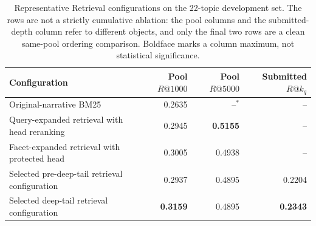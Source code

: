 \begin{table}[tb]
\centering
\caption{Representative Retrieval configurations on the 22-topic
development set. The rows are not a strictly cumulative ablation: the
pool columns and the submitted-depth column refer to different objects,
and only the final two rows are a clean same-pool ordering comparison.
Boldface marks a column maximum, not statistical significance.}
\label{tab:retrieval-results}
\small
\setlength{\tabcolsep}{4.5pt}
\renewcommand{\arraystretch}{1.12}
\begin{tabularx}{\textwidth}{@{}>{\raggedright\arraybackslash}Xrrr@{}}
\toprule
Configuration & Pool $R@1000$ & Pool $R@5000$ & Submitted $R@k_q$ \\
\midrule
Original-narrative BM25 & 0.2635 & --$^{*}$ & -- \\
Query-expanded retrieval with head reranking & 0.2945 & \textbf{0.5155} & -- \\
Facet-expanded retrieval with protected head & 0.3005 & 0.4938 & -- \\
Selected pre-deep-tail retrieval configuration & 0.2937 & 0.4895 & 0.2204 \\
Selected deep-tail retrieval configuration & \textbf{0.3159} & 0.4895 & \textbf{0.2343} \\
\bottomrule
\end{tabularx}
\smallskip

\end{table}
